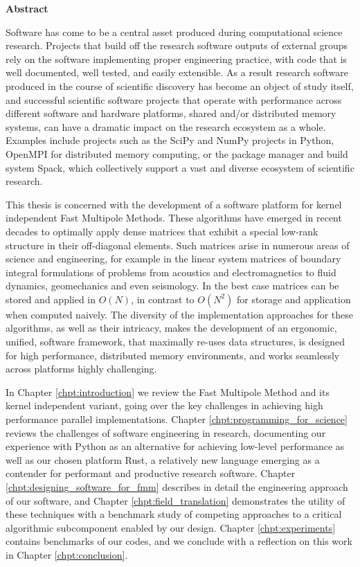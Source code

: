 \thispagestyle{plain}

\begin{center}
    \textbf{Abstract}
\end{center}

Software has come to be a central asset produced during
computational science research. Projects that build off the research software outputs of external groups rely on the software implementing proper engineering practice,
with code that is well documented, well tested, and easily extensible. As a
result research software produced in the course of scientific discovery has
become an object of study itself, and successful scientific software projects
that operate with performance across different software and hardware platforms,
shared and/or distributed memory systems, can have a dramatic impact on the
research ecosystem as a whole. Examples include projects such as the SciPy and
NumPy projects in Python, OpenMPI for distributed memory computing, or the package
manager and build system Spack, which collectively support a vast and diverse ecosystem of scientific
research.

This thesis is concerned with the development of a software platform
for kernel independent Fast Multipole Methods. These algorithms have emerged in recent decades to
optimally apply dense matrices that exhibit
a special low-rank structure in their off-diagonal elements. Such matrices arise
in numerous areas of science and engineering, for example in the linear system
matrices of boundary integral formulations of problems from acoustics and
electromagnetics to fluid dynamics, geomechanics and even seismology. In the
best case matrices can be stored and applied in $O(N)$, in contrast
to $O(N^2)$ for storage and application when computed
naively. The diversity of the implementation approaches for these algorithms, as
well as their intricacy, makes the development of an ergonomic,
unified, software framework, that maximally re-uses data structures, is designed
for high performance, distributed memory environments, and works seamlessly
across platforms highly challenging.

In Chapter \ref{chpt:introduction} we review the Fast Multipole Method and its kernel independent variant, going over the key challenges in achieving high performance parallel implementations. Chapter \ref{chpt:programming_for_science} reviews the challenges of software engineering in research, documenting our experience with Python as an alternative for achieving low-level performance as well as our chosen platform Rust, a relatively new language emerging as a contender for performant and productive research software. Chapter \ref{chpt:designing_software_for_fmm} describes in detail the engineering approach of our software, and Chapter \ref{chpt:field_translation} demonstrates the utility of these techniques with a benchmark study of competing approaches to a critical algorithmic subcomponent enabled by our design. Chapter \ref{chpt:experiments} contains benchmarks of our codes, and we conclude with a reflection on this work in Chapter \ref{chpt:conclusion}.

